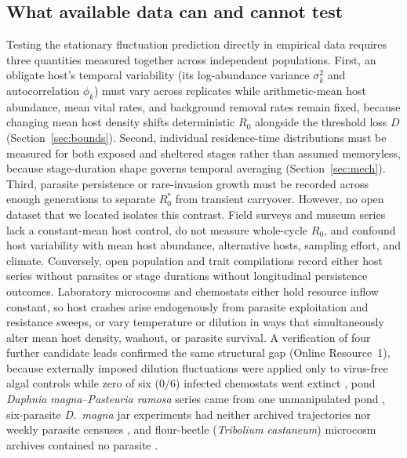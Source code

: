 \subsection{What available data can and cannot test}\label{num-data}

Testing the stationary fluctuation prediction directly in empirical data requires three quantities measured together across independent populations. First, an obligate host's temporal variability (its log-abundance variance $\sigma_k^2$ and autocorrelation $\phi_k$) must vary across replicates while arithmetic-mean host abundance, mean vital rates, and background removal rates remain fixed, because changing mean host density shifts deterministic $R_0$ alongside the threshold loss $D$ (Section~\ref{sec:bounds}). Second, individual residence-time distributions must be measured for both exposed and sheltered stages rather than assumed memoryless, because stage-duration shape governs temporal averaging (Section~\ref{sec:mech}). Third, parasite persistence or rare-invasion growth must be recorded across enough generations to separate $R_0^*$ from transient carryover. However, no open dataset that we located isolates this contrast. Field surveys and museum series lack a constant-mean host control, do not measure whole-cycle $R_0$, and confound host variability with mean host abundance, alternative hosts, sampling effort, and climate. Conversely, open population and trait compilations record either host series without parasites or stage durations without longitudinal persistence outcomes. Laboratory microcosms and chemostats either hold resource inflow constant, so host crashes arise endogenously from parasite exploitation and resistance sweeps, or vary temperature or dilution in ways that simultaneously alter mean host density, washout, or parasite survival. A verification of four further candidate leads confirmed the same structural gap (Online Resource~1), because externally imposed dilution fluctuations were applied only to virus-free algal controls while zero of six ($0/6$) infected chemostats went extinct \citep{lepennec2024}, pond \textit{Daphnia magna}--\textit{Pasteuria ramosa} series came from one unmanipulated pond \citep{tadiri2026}, six-parasite \textit{D.~magna} jar experiments had neither archived trajectories nor weekly parasite censuses \citep{ebert2000}, and flour-beetle (\textit{Tribolium castaneum}) microcosm archives contained no parasite \citep{desharnais2023}.

